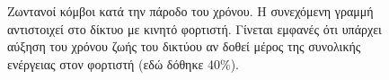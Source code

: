 \begin{figure}[H]
  \centering
  \caption{Ζωντανοί κόμβοι κατά την πάροδο του χρόνου. Η συνεχόμενη γραμμή αντιστοιχεί στο δίκτυο με κινητό φορτιστή. Γίνεται εμφανές ότι υπάρχει αύξηση
	του χρόνου ζωής του δικτύου αν δοθεί μέρος της συνολικής ενέργειας
   στον φορτιστή (εδώ δόθηκε 40\%).}
  \label{fig:1exp_1_1}
\end{figure}

